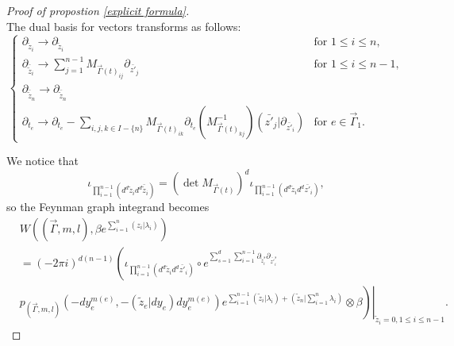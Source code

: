 \documentclass[11pt]{amsart}
\theoremstyle{definition}
\theoremstyle{remark}
\numberwithin{equation}{section}
\begin{document}
\begin{proof}[Proof of propostion \ref{explicit formula}]
$$    $$
    The dual basis for vectors transforms as follows:
    $$
    \begin{cases}
        \partial_{\tilde{z}_{i}}\rightarrow \partial_{\tilde{z}_{i}}&\text{for }1\leq i\leq n,\\
        \partial_{\bar{\tilde{z}}_{i}}\rightarrow \sum\limits_{j=1}^{n-1}
        M_{\vec{\Gamma}(t)_{ij}}\partial_{\bar{z'}_{j}}
         &\text{for }1\leq i\leq n-1,\\
        \partial_{\bar{\tilde{z}}_{n}}\rightarrow \partial_{\bar{\tilde{z}}_{n}}\\
        \partial_{t_{e}}\rightarrow\partial_{t_{e}}-\sum\limits_{i,j,k\in  I-\{n\}}M_{\vec{\Gamma}(t)_{ik}}\partial_{t_{e}}(M^{-1}_{\vec{\Gamma}(t)_{kj}})(\bar{z'}_{j}|\partial_{\bar{z'}_{i}})&\text{for }e\in\vec{\Gamma}_{1}.

    \end{cases}
    $$

    We notice that
    $$
    \iota_{\prod_{i=1}^{n-1}(d^{d}\tilde{z}_{i}d^{d}\bar{\tilde{z}}_{i})}=(\det M_{\vec{\Gamma}(t)})^{d}\iota_{\prod_{i=1}^{n-1}(d^{d}\tilde{z}_{i}d^{d}\bar{z'}_{i})},
    $$
    so the Feynman graph integrand becomes
    \begin{align*}
        &W((\vec{\Gamma},m,l),\beta e^{\sum\limits_{i=1}^{n}(z_{i}|\lambda_{i})})\\
        &=(-2\pi i)^{d(n-1)}\left(
        \iota_{\prod_{i=1}^{n-1}(d^{d}\tilde{z}_{i}d^{d}\bar{z'}_{i})}
        \circ
        e^{\sum\limits_{s=1}^{d}\sum\limits_{i=1}^{n-1}\partial_{\tilde{z}_{i}^{s}}\partial_{\bar{z'}_{i}^{s}}}
        \right.\\
        &\left.\left.p_{(\vec{\Gamma},m,l)}(-dy_{e}^{m(e)},-(\tilde{z}_{e}| dy_{e})dy_{e}^{m(e)})e^{\sum\limits_{i=1}^{n-1}(\tilde{z}_{i}|\lambda_{i})+(\tilde{z}_{n}|\sum\limits_{i=1}^{n}\lambda_{i})}\otimes \beta\right)\right|_{\tilde{z}_{i}=0,1\leq i\leq n-1}.
    \end{align*}


\end{proof}
\end{document}
